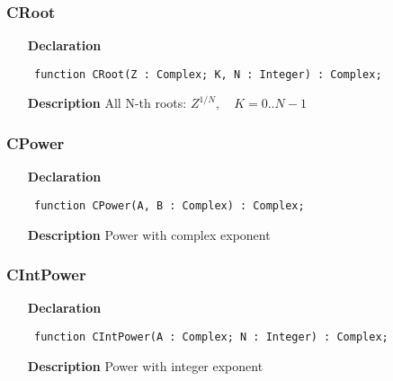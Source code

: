 \documentclass[12pt,a4paper,oneside]{report}
\newcommand{\declarationitem}[1]{\textbf{#1}}
\newcommand{\descriptiontitle}[1]{\textbf{#1}}
\newcommand{\code}[1]{\texttt{#1}}
\begin{document}
\subsubsection{CRoot}
\label{ucomplex-CRoot}
\begin{itemize}\item[\declarationitem{Declaration}\hfill]
\begin{flushleft}
\code{
function CRoot(Z : Complex; K, N : Integer) : Complex;}

\end{flushleft}

\par
\item[\descriptiontitle{Description}]
All N{-}th roots: $Z^{1/N},\quad K=0..N-1$
\end{itemize}
\subsubsection{CPower}
\label{ucomplex-CPower}
\begin{itemize}\item[\declarationitem{Declaration}\hfill]
\begin{flushleft}
\code{
function CPower(A, B : Complex) : Complex;}

\end{flushleft}

\par
\item[\descriptiontitle{Description}]
Power with complex exponent

\end{itemize}
\subsubsection{CIntPower}
\label{ucomplex-CIntPower}
\begin{itemize}\item[\declarationitem{Declaration}\hfill]
\begin{flushleft}
\code{
function CIntPower(A : Complex; N : Integer) : Complex;}

\end{flushleft}

\par
\item[\descriptiontitle{Description}]
Power with integer exponent

\end{itemize}
\end{document}
